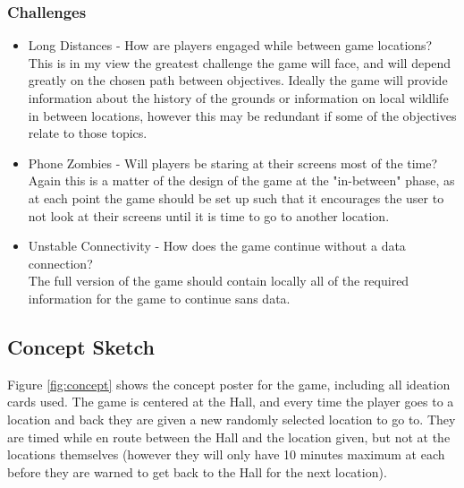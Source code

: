 \documentclass[12pt, a4paper]{article}
\begin{document}
\subsubsection{Challenges}
\begin{itemize}
  \item Long Distances - How are players engaged while between game locations?\\
        This is in my view the greatest challenge the game will face, and will depend greatly on the chosen path between objectives.
        Ideally the game will provide information about the history of the grounds or information on local wildlife in between locations, however this may be redundant if some of the objectives relate to those topics.
  \item Phone Zombies - Will players be staring at their screens most of the time?\\
        Again this is a matter of the design of the game at the "in-between" phase, as at each point the game should be set up such that it encourages the user to not look at their screens until it is time to go to another location.
  \item Unstable Connectivity - How does the game continue without a data connection?\\
        The full version of the game should contain locally all of the required information for the game to continue sans data.
\end{itemize}

\subsection{Concept Sketch}

Figure \ref{fig:concept} shows the concept poster for the game, including all ideation cards used.
The game is centered at the Hall, and every time the player goes to a location and back they are given a new randomly selected location to go to.
They are timed while en route between the Hall and the location given, but not at the locations themselves (however they will only have 10 minutes maximum at each before they are warned to get back to the Hall for the next location).
\end{document}
